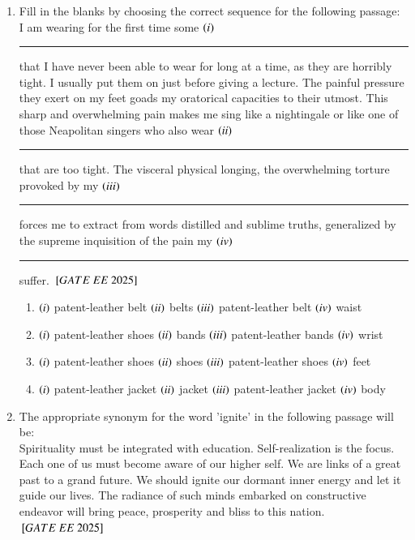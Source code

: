 \documentclass[journal,12pt,onecolumn]{IEEEtran}
\theoremstyle{remark}
\begin{document}
\begin{enumerate}
   \item Fill in the blanks by choosing the correct sequence for the following passage: \\  
 I am wearing for the first time some  $\left(i\right)$\rule{2cm}{0.4pt} that I have never been able to wear for long at a time, as they are horribly tight. I usually put them on just before giving a lecture. The painful pressure they exert on my feet goads my oratorical capacities to their utmost. This sharp and overwhelming pain makes me sing like a nightingale or like one of those Neapolitan singers who also wear  $\left(ii\right)$\rule{2cm}{0.4pt} that are too tight. The visceral physical longing, the overwhelming torture provoked by my  $\left(iii\right)$\rule{2cm}{0.4pt}  forces me to extract from words distilled and sublime truths, generalized by the supreme inquisition of the pain my  $\left(iv\right)$\rule{2cm}{0.4pt} suffer.
$\sbrak{GATE\ EE\ 2025}$\\ 
    \begin{enumerate}[label=(\Alph*)]
\item  $\left(i\right)$ patent-leather belt  $\left(ii\right)$ belts  $\left(iii\right)$ patent-leather belt  $\left(iv\right)$ waist \\
\item  $\left(i\right)$ patent-leather shoes  $\left(ii\right)$ bands  $\left(iii\right)$ patent-leather bands  $\left(iv\right)$ wrist \\
\item  $\left(i\right)$ patent-leather shoes  $\left(ii\right)$ shoes  $\left(iii\right)$ patent-leather shoes  $\left(iv\right)$ feet \\
\item  $\left(i\right)$ patent-leather jacket  $\left(ii\right)$ jacket  $\left(iii\right)$ patent-leather jacket  $\left(iv\right)$ body \\
    \end{enumerate}
  \item The appropriate synonym for the word 'ignite' in the following passage will be: \\ 
Spirituality must be integrated with education. Self-realization is the focus. Each one of us must become aware of our higher self. We are links of a great past to a grand future. We should ignite our dormant inner energy and let it guide our lives. The radiance of such minds embarked on constructive endeavor will bring peace, prosperity and bliss to this nation.\\   
$\sbrak{GATE\ EE\ 2025}$\\  
    \begin{enumerate}[label=(\Alph*)]

\end{enumerate}
\end{enumerate}
\end{document}
